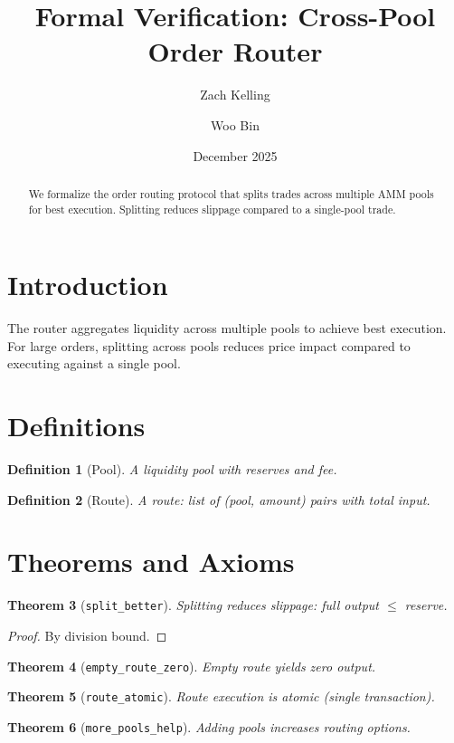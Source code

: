 \documentclass[11pt]{article}
\title{Formal Verification: Cross-Pool Order Router}
\author{Zach Kelling \and Woo Bin}
\date{December 2025}
\newtheorem{theorem}{Theorem}
\newtheorem{definition}[theorem]{Definition}
\begin{document}
\maketitle

\begin{abstract}
We formalize the order routing protocol that splits trades across multiple AMM pools for best execution. Splitting reduces slippage compared to a single-pool trade.
\end{abstract}

\section{Introduction}
The router aggregates liquidity across multiple pools to achieve best execution. For large orders, splitting across pools reduces price impact compared to executing against a single pool.

\section{Definitions}
\begin{definition}[Pool]
A liquidity pool with reserves and fee.
\end{definition}

\begin{definition}[Route]
A route: list of (pool, amount) pairs with total input.
\end{definition}


\section{Theorems and Axioms}
\begin{theorem}[\texttt{split\_better}]
Splitting reduces slippage: full output $\leq$ reserve.
\end{theorem}
\begin{proof}
By division bound.
\end{proof}

\begin{theorem}[\texttt{empty\_route\_zero}]
Empty route yields zero output.
\end{theorem}

\begin{theorem}[\texttt{route\_atomic}]
Route execution is atomic (single transaction).
\end{theorem}

\begin{theorem}[\texttt{more\_pools\_help}]
Adding pools increases routing options.
\end{theorem}
\end{document}
